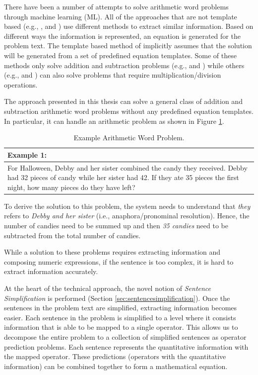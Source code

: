 \documentclass[11pt]{article}
\begin{document}
There have been a number of attempts to solve arithmetic word problems through machine learning (ML). 
All of the approaches that are not template based (e.g., \citep{ARIS}, \citep{RoyTACL15} and \citep{RoyR15}) use different methods to extract similar information. Based on different ways the information is represented, an equation is generated for the problem text. The template based method of \citep{Kushman} implicitly assumes that the solution will be generated from a set of predefined equation templates. Some of these methods only solve addition and subtraction problems (e.g., \citep{ARIS} and \citep{RoyTACL15}) while others (e.g., \citep{RoyR15} and \citep{Kushman}) can also solve problems that require multiplication/division operations.

The approach presented in this thesis can solve a general class of addition and subtraction arithmetic word problems without any predefined equation templates. In particular, it can handle an arithmetic problem as shown in Figure \ref{figure:1}.

\begin{table}[h!]
\centering
\begin{tabular}{ | m{25em} | }
\hline
\textbf{Example 1:}\\
\hline
For Halloween, Debby and her sister combined the candy they received. Debby had 32 pieces of candy while her sister had 42. If they ate 35 pieces the first night, how many pieces do they have left?\\
\hline
\end{tabular}
\caption{Example Arithmetic Word Problem.}
\label{figure:1}
\end{table}

To derive the solution to this problem, the system needs to understand that \textit{they} refers to \textit{Debby and her sister} (i.e., anaphora/pronominal resolution). Hence, the number of candies need to be summed up and then \textit{35 candies} need to be subtracted from the total number of candies. 

While a solution to these problems requires extracting information and composing numeric expressions, if the sentence is too complex, it is hard to extract information accurately.

At the heart of the technical approach, the novel notion of \textit{Sentence Simplification} is performed (Section \ref{sec:sentencesimplification}). Once the sentences in the problem text are simplified, extracting information becomes easier. Each sentence in the problem is simplified to a level where it consists information that is able to be mapped to a single operator. This allows us to decompose the entire problem to a collection of simplified sentences as operator prediction problems. Each sentence represents the quantitative information with the mapped operator. These predictions (operators with the quantitative information) can be combined together to form a mathematical equation.
\end{document}
